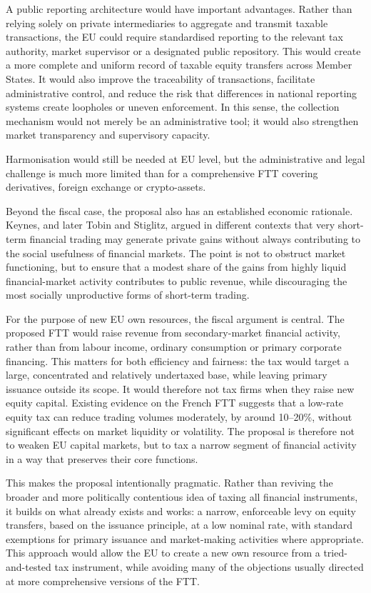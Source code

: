 \documentclass[../../main]{subfiles}
\begin{document}
A public reporting architecture would have important advantages. Rather than relying solely on private intermediaries to aggregate and transmit taxable transactions, the EU could require standardised reporting to the relevant tax authority, market supervisor or a designated public repository. This would create a more complete and uniform record of taxable equity transfers across Member States. It would also improve the traceability of transactions, facilitate administrative control, and reduce the risk that differences in national reporting systems create loopholes or uneven enforcement. In this sense, the collection mechanism would not merely be an administrative tool; it would also strengthen market transparency and supervisory capacity.

Harmonisation would still be needed at EU level, but the administrative and legal challenge is much more limited than for a comprehensive FTT covering derivatives, foreign exchange or crypto-assets.

Beyond the fiscal case, the proposal also has an established economic rationale. Keynes, and later Tobin and Stiglitz, argued in different contexts that very short-term financial trading may generate private gains without always contributing to the social usefulness of financial markets. The point is not to obstruct market functioning, but to ensure that a modest share of the gains from highly liquid financial-market activity contributes to public revenue, while discouraging the most socially unproductive forms of short-term trading.

For the purpose of new EU own resources, the fiscal argument is central. The proposed FTT would raise revenue from secondary-market financial activity, rather than from labour income, ordinary consumption or primary corporate financing. This matters for both efficiency and fairness: the tax would target a large, concentrated and relatively undertaxed base, while leaving primary issuance outside its scope. It would therefore not tax firms when they raise new equity capital. Existing evidence on the French FTT suggests that a low-rate equity tax can reduce trading volumes moderately, by around 10--20\%, without significant effects on market liquidity or volatility. The proposal is therefore not to weaken EU capital markets, but to tax a narrow segment of financial activity in a way that preserves their core functions.

This makes the proposal intentionally pragmatic. Rather than reviving the broader and more politically contentious idea of taxing all financial instruments, it builds on what already exists and works: a narrow, enforceable levy on equity transfers, based on the issuance principle, at a low nominal rate, with standard exemptions for primary issuance and market-making activities where appropriate. This approach would allow the EU to create a new own resource from a tried-and-tested tax instrument, while avoiding many of the objections usually directed at more comprehensive versions of the FTT.
\end{document}
